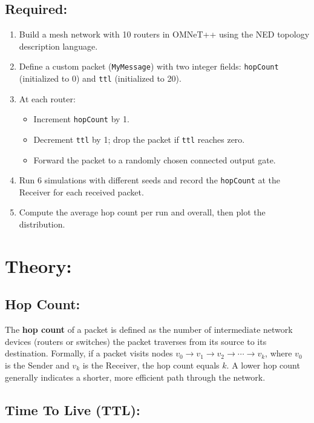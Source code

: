 \documentclass[12pt,a4paper]{article}
\begin{document}
\subsection*{Required:}
\begin{enumerate}
  \item Build a mesh network with 10 routers in OMNeT++ using the NED topology description language.
  \item Define a custom packet (\texttt{MyMessage}) with two integer fields: \texttt{hopCount} (initialized to 0) and \texttt{ttl} (initialized to 20).
  \item At each router:
  \begin{itemize}
    \item Increment \texttt{hopCount} by 1.
    \item Decrement \texttt{ttl} by 1; drop the packet if \texttt{ttl} reaches zero.
    \item Forward the packet to a randomly chosen connected output gate.
  \end{itemize}
  \item Run 6 simulations with different seeds and record the \texttt{hopCount} at the Receiver for each received packet.
  \item Compute the average hop count per run and overall, then plot the distribution.
\end{enumerate}
\section{Theory: }

\subsection{Hop Count: }

\justifying
The \textbf{hop count} of a packet is defined as the number of intermediate network devices (routers or switches) the packet traverses from its source to its destination. Formally, if a packet visits nodes $v_0 \to v_1 \to v_2 \to \cdots \to v_k$, where $v_0$ is the Sender and $v_k$ is the Receiver, the hop count equals $k$. A lower hop count generally indicates a shorter, more efficient path through the network.

\subsection{Time To Live (TTL): }
\end{document}

